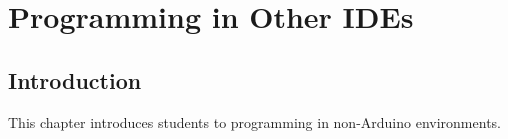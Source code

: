 \chapter{Programming in Other IDEs}

\section{Introduction}
This chapter introduces students to programming in non-Arduino environments.
